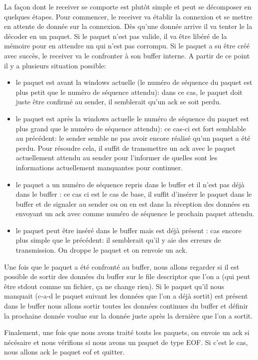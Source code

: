 \documentclass[12pt,notitlepage]{report}
\begin{document}
	La façon dont le receiver se comporte est plutôt simple et peut se décomposer en quelques étapes. Pour commencer, le receiver va établir la connexion et se mettre en attente de donnée sur la connexion. Dès qu'une donnée arrive il va tenter le la décoder en un paquet. Si le paquet n'est pas valide, il va être libéré de la mémoire pour en attendre un qui n'est pas corrompu. Si le paquet a su être créé avec succès, le receiver va le confronter à son buffer interne. A partir de ce point il y a plusieurs situation possible: 
	\begin{itemize}
	\item le paquet est avant la windows actuelle (le numéro de séquence du paquet est plus petit que le numéro de séquence attendu): dans ce cas, le paquet doit juste être confirmé au sender, il semblerait qu'un ack se soit perdu.
	\item le paquet est après la windows actuelle le numéro de séquence du paquet est plus grand que le numéro de séquence attendu): ce cas-ci est fort semblable au précédent: le sender semble ne pas avoir encore réalisé qu'un paquet a été perdu. Pour résoudre cela, il suffit de transmettre un ack avec le paquet actuellement attendu au sender pour l'informer de quelles sont les informations actuellement manquantes pour continuer.
	\item le paquet a un numéro de séquence repris dans le buffer et il n'est pas déjà dans le buffer : ce cas ci est le cas de base, il suffit d'insérer le paquet dans le buffer et de signaler au sender ou on en est dans la réception des données en envoyant un ack avec comme numéro de séquence le prochain paquet attendu.
	\item le paquet peut être inséré dans le buffer mais est déjà présent : cas encore plus simple que le précédent: il semblerait qu'il y aie des erreurs de transmission. On droppe le paquet et on renvoie un ack.
	\end{itemize}
	
	Une fois que le paquet a été confronté au buffer, nous allons regarder si il est possible de sortir des données du buffer sur le file descriptor que l'on a (qui peut être stdout comme un fichier, ça ne change rien). Si le paquet qu'il nous manquait (c-a-d le paquet suivant les données que l'on a déjà sortit) est présent dans le buffer nous allons sortir toutes les données continues du buffer  et définir la prochaine donnée voulue sur la donnée juste après la dernière que l'on a sortit.
	
	Finalement, une fois que nous avons traité touts les paquets, on envoie un ack si nécésaire et nous vérifions si nous avons un paquet de type EOF. Si c'est le cas, nous allons ack le paquet eof et quitter.
	
\end{document}
